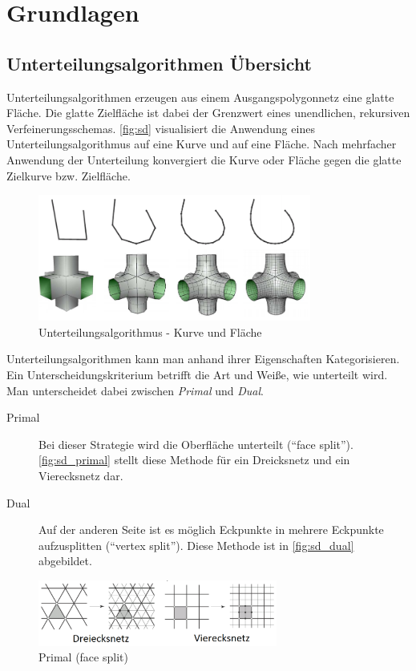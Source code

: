 \chapter{Grundlagen}


\section{Unterteilungsalgorithmen Übersicht}

Unterteilungsalgorithmen erzeugen aus einem Ausgangspolygonnetz eine glatte Fläche.
Die glatte Zielfläche ist dabei der Grenzwert eines unendlichen, rekursiven Verfeinerungsschemas.
\autoref{fig:sd} visualisiert die Anwendung eines Unterteilungsalgorithmus auf eine Kurve und auf eine Fläche.
Nach mehrfacher Anwendung der Unterteilung konvergiert die Kurve oder Fläche gegen die glatte Zielkurve bzw. Zielfläche.

\begin{figure}
  \centering
  \includegraphics[width=0.8\textwidth]{content/media/sd.png}
  \caption{Unterteilungsalgorithmus - Kurve und Fläche \cite{Standford.24.07.2015}}
  \label{fig:sd}
\end{figure}

Unterteilungsalgorithmen kann man anhand ihrer Eigenschaften Kategorisieren.
Ein Unterscheidungskriterium betrifft die Art und Weiße, wie unterteilt wird.
Man unterscheidet dabei zwischen \emph{Primal} und \emph{Dual}.

\begin{description}
 \item[Primal] Bei dieser Strategie wird die Oberfläche unterteilt (\enquote{face split}).
\autoref{fig:sd_primal} stellt diese Methode für ein Dreicksnetz und ein Vierecksnetz dar.
 \item[Dual] Auf der anderen Seite ist es möglich Eckpunkte in mehrere Eckpunkte aufzusplitten (\enquote{vertex split}).
 Diese Methode ist in \autoref{fig:sd_dual} abgebildet.

\end{description}
\begin{figure}
  \centering
  \includegraphics[width=0.7\textwidth]{content/media/sd_primal}
  \caption{Primal (face split) \cite{Standford.24.07.2015}}
  \label{fig:sd_primal}
\end{figure}

